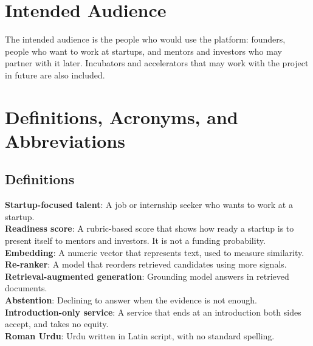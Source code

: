 \documentclass{FastFyp}
\begin{document}
\section{Intended Audience}
The intended audience is the people who would use the platform: founders, people who want to work at startups, and mentors and investors who may partner with it later. Incubators and accelerators that may work with the project in future are also included.

\section{Definitions, Acronyms, and Abbreviations}\label{sec:defs}
\subsection{Definitions}
\textbf{Startup-focused talent}: A job or internship seeker who wants to work at a startup.\\
\textbf{Readiness score}: A rubric-based score that shows how ready a startup is to present itself to mentors and investors. It is not a funding probability.\\
\textbf{Embedding}: A numeric vector that represents text, used to measure similarity.\\
\textbf{Re-ranker}: A model that reorders retrieved candidates using more signals.\\
\textbf{Retrieval-augmented generation}: Grounding model answers in retrieved documents.\\
\textbf{Abstention}: Declining to answer when the evidence is not enough.\\
\textbf{Introduction-only service}: A service that ends at an introduction both sides accept, and takes no equity.\\
\textbf{Roman Urdu}: Urdu written in Latin script, with no standard spelling.
\end{document}
